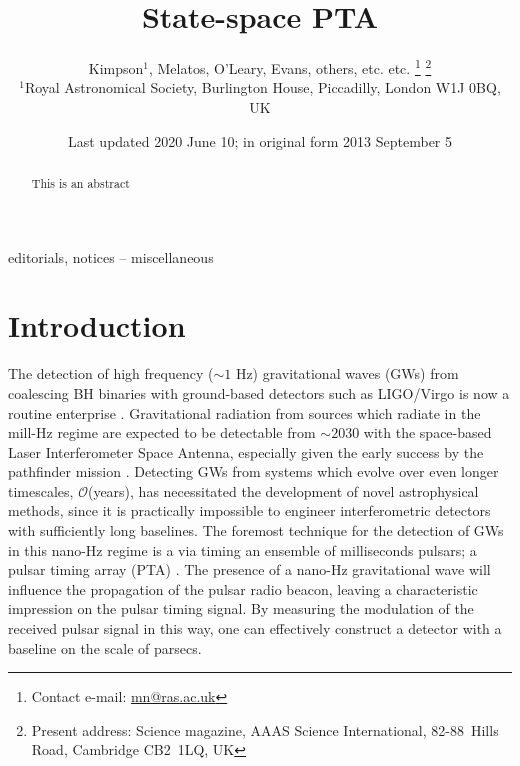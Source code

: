 \documentclass[fleqn,usenatbib,useAMS]{mnras}
\title[Kalman PTA]{State-space PTA}
\author[Kimpson]{Kimpson$^{1}$, Melatos, O'Leary, Evans, others, etc. etc. %
\thanks{Contact e-mail: \href{mailto:mn@ras.ac.uk}{mn@ras.ac.uk}}%
\thanks{Present address: Science magazine, AAAS Science International, \mbox{82-88}~Hills Road, Cambridge CB2~1LQ, UK}%
\\
$^{1}$Royal Astronomical Society, Burlington House, Piccadilly, London W1J 0BQ, UK}
\date{Last updated 2020 June 10; in original form 2013 September 5}
\begin{document}
\label{firstpage}
\pagerange{\pageref{firstpage}--\pageref{lastpage}}
\maketitle

\begin{abstract}
This is an abstract
\end{abstract}

\begin{keywords}
editorials, notices -- miscellaneous
\end{keywords}



\begingroup
\let\clearpage\relax
\endgroup
\newpage

\section{Introduction}



The detection of high frequency ($\sim1$ Hz) gravitational waves (GWs) from coalescing BH binaries with ground-based detectors such as LIGO/Virgo \citep{aLIGO,2015CQGra..32b4001A} is now a routine enterprise \citep[e.g.][]{2019PhRvX...9c1040A,2021PhRvX..11b1053A}. Gravitational radiation from sources which radiate in the mill-Hz regime are expected to be detectable from $\sim 2030$ with the space-based Laser Interferometer Space Antenna, \citep{LISApaper} especially given the early success by the pathfinder mission \citep{2019arXiv190308924A}. Detecting GWs from systems which evolve over even longer timescales, $\mathcal{O}$(years), has necessitated the development of novel astrophysical methods, since it is practically impossible to engineer interferometric detectors with sufficiently long baselines. The foremost technique for the detection of GWs in this nano-Hz regime is a via timing an ensemble of milliseconds pulsars; a pulsar timing array (PTA) \citep{2021hgwa.bookE...4V}. The presence  of a nano-Hz gravitational wave will influence the propagation of the pulsar radio beacon, leaving a characteristic impression on the pulsar timing signal. By measuring the modulation of the received pulsar signal in this way, one can effectively construct a detector with a baseline on the scale of parsecs. \newline 
\end{document}
